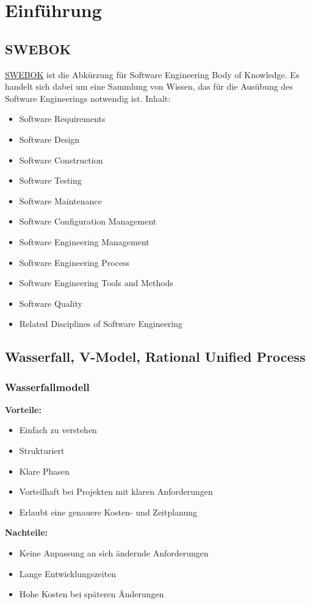 \section{Einführung}
\label{sec:einfuehrung}

\subsection{SWEBOK}
\label{subsec:swebok}

\href{http://www.computer.org/web/swebok}{SWEBOK} ist die Abkürzung für Software Engineering Body of Knowledge. Es handelt sich dabei um eine Sammlung von Wissen, das für die Ausübung des Software Engineerings notwendig ist. Inhalt:
\begin{itemize}
    \item Software Requirements
    \item Software Design
    \item Software Construction
    \item Software Testing
    \item Software Maintenance
    \item Software Configuration Management
    \item Software Engineering Management
    \item Software Engineering Process
    \item Software Engineering Tools and Methods
    \item Software Quality
    \item Related Disciplines of Software Engineering
\end{itemize}

\subsection{Wasserfall, V-Model, Rational Unified Process}
\label{subsec:wasserfall-v-modell}

\subsubsection{Wasserfallmodell}
\label{subsubsec:wasserfallmodell}
\textbf{Vorteile:}
\begin{itemize}
    \item Einfach zu verstehen
    \item Strukturiert
    \item Klare Phasen
    \item Vorteilhaft bei Projekten mit klaren Anforderungen
    \item Erlaubt eine genauere Kosten- und Zeitplanung
\end{itemize}
\textbf{Nachteile:}
\begin{itemize}
    \item Keine Anpassung an sich ändernde Anforderungen
    \item Lange Entwicklungszeiten
    \item Hohe Kosten bei späteren Änderungen
\end{itemize}

